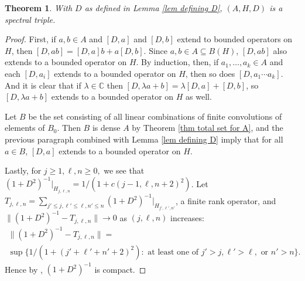 \documentclass[12pt]{amsart}
\newcommand{\sse}{\subseteq}
\newcommand{\C}{\mathbb{C}}
\newcommand{\la}{\lambda}
\theoremstyle{plain} %
\newtheorem{Theorem}{Theorem}[section]
\theoremstyle{definition} %
\begin{document}
\begin{Theorem}\label{thm D is a Dirac operator}
    With $D$ as defined in Lemma \ref{lem defining D}, $(A, H, D)$ is a spectral triple.
\end{Theorem}

\begin{proof}
    First, if $a, b\in A$ and $[D, a]$ and $[D, b]$ extend to bounded operators on $H$, then $[D, ab] = [D,a]b + a[D, b]$. Since $a, b \in A \sse B(H)$, $[D,ab]$ also extends to a bounded operator on $H$. By induction, then, if $a_1, \dots, a_k \in A$ and each $[D, a_i]$ extends to a bounded operator on $H$, then so does $[D, a_1 \cdots a_k]$. And it is clear that if $\la \in \C$ then $[D, \la a + b] = \la [D, a] + [D,b]$, so $[D, \la a + b]$ extends to a bounded operator on $H$ as well.

    Let $B$ be the set consisting of all linear combinations of finite convolutions of elements of $B_0$. Then $B$ is dense $A$ by Theorem \ref{thm total set for A}, and the previous paragraph combined with Lemma \ref{lem defining D} imply that for all $a \in B$, $[D,a]$ extends to a bounded operator on $H$.

    Lastly, for $j \ge 1, \ell,n \ge 0,$ we see that $(1+D^2)^{-1}|_{H_{j,\ell,n}} = 1/(1 + c(j-1,\ell,n+2)^2)$. Let $T_{j,\ell,n} = \sum_{j' \le j, \ell' \le \ell, n' \le n} (1+D^2)^{-1}|_{H_{j', \ell', n'}}$, a finite rank operator, and $\|(1+D^2)^{-1} - T_{j,\ell,n}\| \to 0$ as $(j,\ell,n)$ increases: 
    \begin{multline*}
        \| (1+D^2)^{-1} - T_{j,\ell,n} \| =\\ \sup \{ 1/(1 + (j' + \ell' + n' + 2)^2) : \text{ at least one of } j' > j, \ell' > \ell, \text{ or } n' > n \}.
    \end{multline*}
    Hence by \cite[Theorem 4.4]{Con90}, $(1+D^2)^{-1}$ is compact.
\end{proof}


   



  
\end{document}
